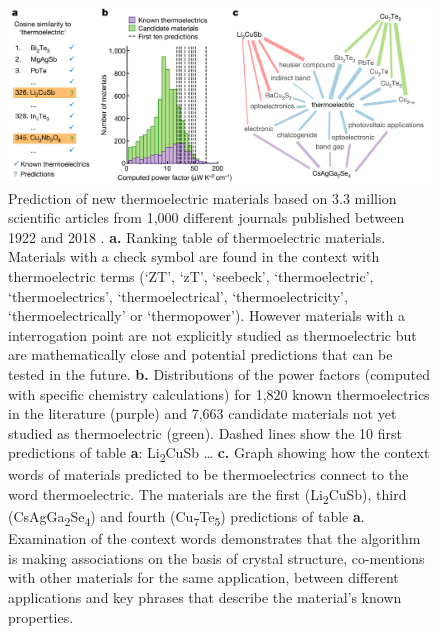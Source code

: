 \begin{figure}[]
	\centering
	\includegraphics[width=1.0\textwidth]{imgs/Tshitoyan2019_Material_Predictions_01}
	\caption{Prediction of new thermoelectric materials based on 3.3 million scientific articles from 1,000 different journals published between 1922 and 2018 \cite{Tshitoyan2019}. 
		\newline
		\textbf{a.} Ranking table of thermoelectric materials. Materials with a check symbol are found in the context with thermoelectric terms (\ie ‘ZT’, ‘zT’, ‘seebeck’, ‘thermoelectric’, ‘thermoelectrics’, ‘thermoelectrical’, ‘thermoelectricity’, ‘thermoelectrically’ or ‘thermopower’). However materials with a interrogation point are not explicitly studied as thermoelectric but are \doq mathematically\deq{} close and potential predictions that can be tested in the future.
		\newline
		\textbf{b.} Distributions of the power factors (computed with specific chemistry calculations) for 1,820 known thermoelectrics in the literature (purple) and 7,663 candidate materials not yet studied as thermoelectric (green). Dashed lines show the 10 first predictions of table \textbf{a}: Li\textsubscript{2}CuSb \ldots
		\newline
		\textbf{c.} Graph showing how the context words of materials predicted to be thermoelectrics connect to the word thermoelectric. The materials are the first (Li\textsubscript{2}CuSb), third (CsAgGa\textsubscript{2}Se\textsubscript{4}) and fourth (Cu\textsubscript{7}Te\textsubscript{5}) predictions of table \textbf{a}. Examination of the context words demonstrates that the algorithm is making associations on the basis of crystal structure, co-mentions with other materials for the same application, between different applications and key phrases that describe the material’s known properties.
	}
	\label{MaterialPrediction01}
\end{figure}

